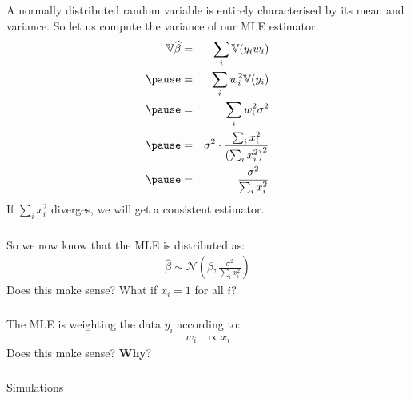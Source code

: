 \begin{frame}[fragile] \frametitle{}

A normally distributed random variable is entirely characterised
by its mean and variance. So let us compute the variance of our
MLE estimator:
\begin{eqnarray*}
\mathbb{V} \widehat{\beta} &=& \sum_i \mathbb{V} (y_i w_i) \\ \pause
&=& \sum_i w_i^2 \mathbb{V} (y_i) \\ \pause
&=& \sum_i w_i^2 \sigma^2 \\ \pause
&=& \sigma^2 \cdot \frac{\sum_i x_i^2}{\left(\sum_i x_i^2\right)^2}   \\ \pause
&=& \frac{\sigma^2}{\sum_i x_i^2}
\end{eqnarray*}
If $\sum_i x_i^2$ diverges, we will get a consistent estimator.

\end{frame}

\begin{frame}[fragile] \frametitle{}

So we now know that the MLE is distributed as:
\begin{align*}
\widehat{\beta} \sim \mathcal{N} (\beta, \frac{\sigma^2}{\sum_i x_i^2})
\end{align*}
\pause Does this make sense? What if $x_i = 1$ for
all $i$?

\end{frame}

\begin{frame}[fragile] \frametitle{}

The MLE is weighting the data $y_i$ according to:
\begin{align*}
w_i &\propto x_i
\end{align*}
\pause Does this make sense? {\bf Why}?

\end{frame}

\begin{frame}[fragile] \frametitle{}

\begin{flushright}
{\color{yaleblue}\sc\fontsize{1cm}{0cm}\selectfont Simulations}
\end{flushright}

\end{frame}

